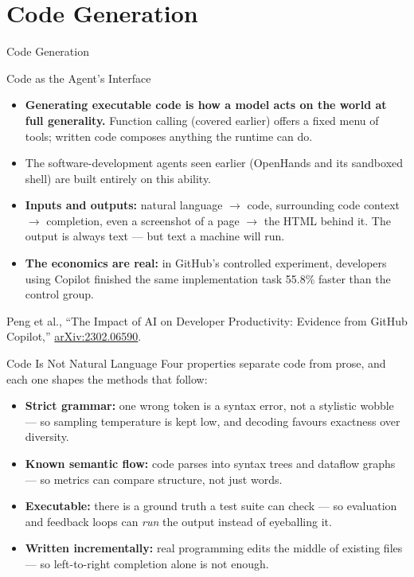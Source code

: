 \section{Code Generation}
\begin{frame}{}
  \LARGE Code Generation
\end{frame}

\begin{frame}{Code as the Agent's Interface}
  \begin{itemize}\itemsep0.4em
    \item[\textcolor{red}{$\triangleright$}] \textbf{Generating executable code is how a model acts on the
      world at full generality.} Function calling (covered earlier) offers a fixed menu of tools; written
      code composes anything the runtime can do.
    \item[\textcolor{red}{$\triangleright$}] The software-development agents seen earlier (OpenHands and its
      sandboxed shell) are built entirely on this ability.
    \item[\textcolor{red}{$\triangleright$}] \textbf{Inputs and outputs:} natural language $\rightarrow$ code,
      surrounding code context $\rightarrow$ completion, even a screenshot of a page $\rightarrow$ the HTML
      behind it. The output is always text --- but text a machine will run.
    \item[\textcolor{red}{$\triangleright$}] \textbf{The economics are real:} in GitHub's controlled
      experiment, developers using Copilot finished the same implementation task 55.8\% faster than the
      control group.
  \end{itemize}
  \vspace{0.3em}
  {\scriptsize Peng et al., ``The Impact of AI on Developer Productivity: Evidence from GitHub Copilot,''
  \href{https://arxiv.org/abs/2302.06590}{arXiv:2302.06590}.}
\end{frame}

\begin{frame}{Code Is Not Natural Language}
  Four properties separate code from prose, and each one shapes the methods that follow:
  \begin{itemize}\itemsep0.5em
    \item[\textcolor{red}{$\triangleright$}] \textbf{Strict grammar:} one wrong token is a syntax error, not
      a stylistic wobble --- so sampling temperature is kept low, and decoding favours exactness over
      diversity.
    \item[\textcolor{red}{$\triangleright$}] \textbf{Known semantic flow:} code parses into syntax trees and
      dataflow graphs --- so metrics can compare structure, not just words.
    \item[\textcolor{red}{$\triangleright$}] \textbf{Executable:} there is a ground truth a test suite can
      check --- so evaluation and feedback loops can \emph{run} the output instead of eyeballing it.
    \item[\textcolor{red}{$\triangleright$}] \textbf{Written incrementally:} real programming edits the
      middle of existing files --- so left-to-right completion alone is not enough.
  \end{itemize}
\end{frame}

